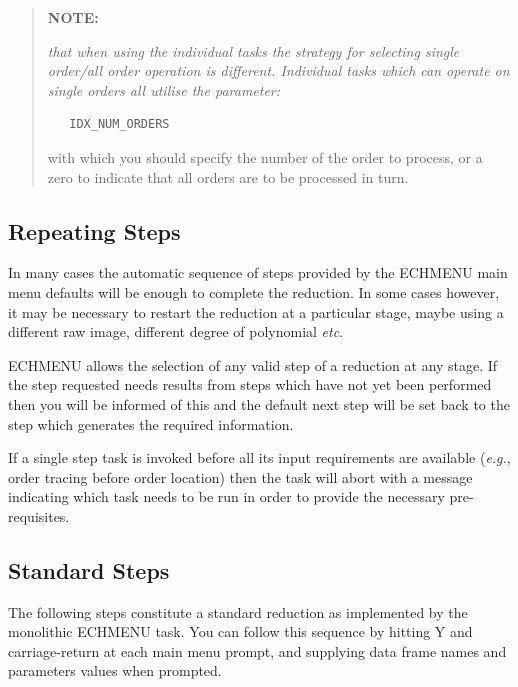 \documentclass[11pt,twoside]{article}
\newcommand{\xlabel}[1]{}
\newcommand{\mlabel}[1]{\xlabel{#1}\label{#1}}
\newcommand{\myindex}[1]{\index{#1}}
\renewcommand{\myindex}[1]{}
\begin{document}
\begin{quote}

   {\bf NOTE:} {\sl that when using the individual tasks the strategy for
   selecting single order/all order operation is different.  Individual
   tasks which can operate on single orders all utilise the parameter:

\begin{verbatim}
   IDX_NUM_ORDERS
\end{verbatim}

   with which you should specify the number of the order to process, or a
   zero to indicate that all orders are to be processed in turn.}
\end{quote}


\subsection{\mlabel{repeating_steps}Repeating Steps}
\myindex{Repeating steps}

In many cases the automatic sequence of steps provided by the ECHMENU
main menu defaults will be enough to complete the reduction. In some
cases however, it may be necessary to restart the reduction at a
particular stage, maybe using a different raw image, different degree
of polynomial {\it etc}.

ECHMENU allows the selection of any valid step of a reduction at any stage.
If the step requested needs results from steps which have not yet been
performed then you will be informed of this and the default next step
will be set back to the step which generates the required information.
\myindex{Single step tasks}
If a single step task is invoked before all its input requirements are
available ({\it{e.g.}}, order tracing before order location) then the task
will abort with a message indicating which task needs to be run in order to
provide the necessary pre-requisites.


\subsection{\mlabel{standard_steps}Standard Steps}

The following steps constitute a standard reduction as implemented by
the monolithic ECHMENU task.  You can follow this sequence by hitting
Y and carriage-return at each main menu prompt, and supplying data frame names
and parameters values when prompted.
\myindex{Frame!dimensions}
\myindex{Cosmic rays}
\myindex{Order!slope}
\myindex{Slope of orders}
\myindex{Order!location}
\myindex{Locating orders}
\end{document}
